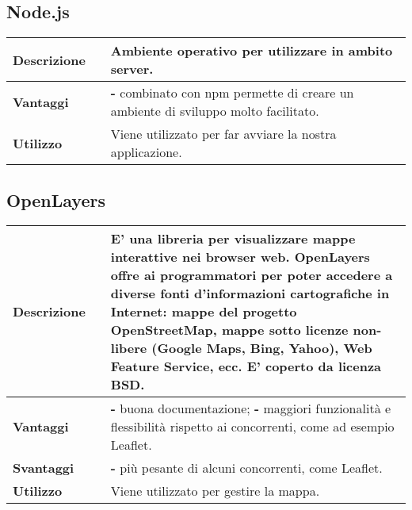 \vspace{40px}
\subsection{Node.js}
\label{Node.js}
\begin{table}[H]
	\centering
	\begin{tabular}{p{2cm}p{0.5cm}p{11.5cm}}
		\arrayrulecolor{lightgray}
		\toprule
		\textbf{Descrizione} & &
		Ambiente operativo per utilizzare \js{} in ambito server.
		\\ \midrule
		\textbf{Vantaggi} & &
		\textbf{- }combinato con npm permette di creare un ambiente di sviluppo molto facilitato.
		\\ \midrule
		\textbf{Utilizzo} & &
		Viene utilizzato per far avviare la nostra applicazione.
		\\ \bottomrule
	\end{tabular}
\end{table}

\newpage
\vspace{40px}
\subsection{OpenLayers}
\label{OpenLayers}
\begin{table}[H]
	\centering
	\begin{tabular}{p{2cm}p{0.5cm}p{11.5cm}}
		\arrayrulecolor{lightgray}
		\toprule
		\textbf{Descrizione} & &
		E' una libreria \js{} per visualizzare mappe interattive nei browser web.
		OpenLayers offre \glo{API}{API} ai programmatori per poter accedere a diverse fonti d'informazioni cartografiche in Internet: mappe del progetto OpenStreetMap, mappe sotto licenze non-libere (Google Maps, Bing, Yahoo), Web Feature Service, ecc. E' coperto da licenza BSD.
		\\ \midrule
		\textbf{Vantaggi} & &
		\textbf{- }buona documentazione;
		\newline
		\textbf{- }maggiori funzionalità e flessibilità rispetto ai concorrenti, come ad esempio Leaflet.
		\\ \midrule
		\textbf{Svantaggi} & &
		\textbf{- }più pesante di alcuni concorrenti, come Leaflet.
		\\ \midrule
		\textbf{Utilizzo} & &
		Viene utilizzato per gestire la mappa.
		\\ \bottomrule
	\end{tabular}
\end{table}



